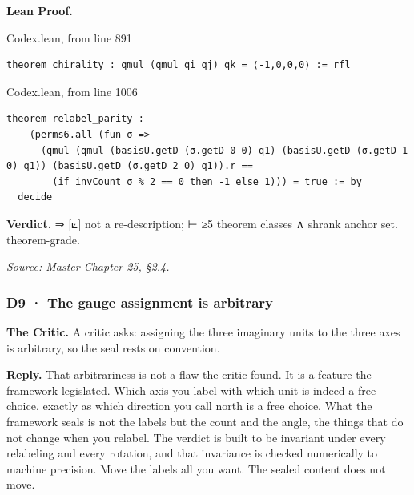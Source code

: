\documentclass[10pt,twocolumn]{article}
\begin{document}
\textbf{Lean Proof.}

\begin{leanexcerpt}{Codex.lean, from line 891}
\begin{lstlisting}[style=leanx,firstnumber=891]
theorem chirality : qmul (qmul qi qj) qk = ⟨-1,0,0,0⟩ := rfl
\end{lstlisting}
\end{leanexcerpt}

\begin{leanexcerpt}{Codex.lean, from line 1006}
\begin{lstlisting}[style=leanx,firstnumber=1006]
theorem relabel_parity :
    (perms6.all (fun σ =>
      (qmul (qmul (basisU.getD (σ.getD 0 0) q1) (basisU.getD (σ.getD 1 0) q1)) (basisU.getD (σ.getD 2 0) q1)).r ==
        (if invCount σ % 2 == 0 then -1 else 1))) = true := by
  decide
\end{lstlisting}
\end{leanexcerpt}

\textbf{Verdict.} ⇒ {[}⟀{]} not a re-description; ⊢ ≥5 theorem classes ∧
shrank anchor set. theorem-grade.

\emph{Source: Master Chapter 25, §2.4.}

\hypertarget{d9-the-gauge-assignment-is-arbitrary}{%
\subsubsection{D9 · The gauge assignment is
arbitrary}\label{d9-the-gauge-assignment-is-arbitrary}}

\textbf{The Critic.} A critic asks: assigning the three imaginary units
to the three axes is arbitrary, so the seal rests on convention.

\textbf{Reply.} That arbitrariness is not a flaw the critic found. It is
a feature the framework legislated. Which axis you label with which unit
is indeed a free choice, exactly as which direction you call north is a
free choice. What the framework seals is not the labels but the count
and the angle, the things that do not change when you relabel. The
verdict is built to be invariant under every relabeling and every
rotation, and that invariance is checked numerically to machine
precision. Move the labels all you want. The sealed content does not
move.
\end{document}
